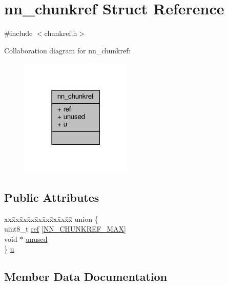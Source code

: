 \hypertarget{structnn__chunkref}{}\section{nn\+\_\+chunkref Struct Reference}
\label{structnn__chunkref}


{\ttfamily \#include $<$chunkref.\+h$>$}



Collaboration diagram for nn\+\_\+chunkref\+:\nopagebreak
\begin{figure}[H]
\begin{center}
\leavevmode
\includegraphics[width=150pt]{structnn__chunkref__coll__graph}
\end{center}
\end{figure}
\subsection*{Public Attributes}
\begin{DoxyCompactItemize}
\item 
\begin{tabbing}
xx\=xx\=xx\=xx\=xx\=xx\=xx\=xx\=xx\=\kill
union \{\\
\>uint8\_t \hyperlink{structnn__chunkref_a0fc4f3dc4f5b28d6f309d903d7d9ab38}{ref} \mbox{[}\hyperlink{chunkref_8h_a3ae177c9424f232e1e80e5556a48b27f}{NN\_CHUNKREF\_MAX}\mbox{]}\\
\>void $\ast$ \hyperlink{structnn__chunkref_a0481e23ecc1944c53854b5d1f424640b}{unused}\\
\} \hyperlink{structnn__chunkref_a4152ee1b9cc806576ba19b302d585d83}{u}\\

\end{tabbing}\end{DoxyCompactItemize}


\subsection{Member Data Documentation}
